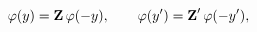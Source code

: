 \begin{equation}
  \varphi(y) = \mbox{\bf{Z}}\,\varphi(-y), \qquad
  \varphi(y') = \mbox{\bf{Z}}'\,\varphi(-y'),
\label{eq:bc-fields}
\end{equation}

